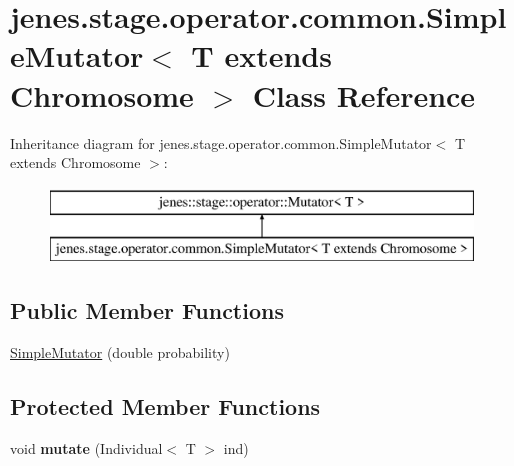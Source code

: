 \hypertarget{classjenes_1_1stage_1_1operator_1_1common_1_1_simple_mutator_3_01_t_01extends_01_chromosome_01_4}{\section{jenes.\-stage.\-operator.\-common.\-Simple\-Mutator$<$ T extends Chromosome $>$ Class Reference}
\label{classjenes_1_1stage_1_1operator_1_1common_1_1_simple_mutator_3_01_t_01extends_01_chromosome_01_4}
}
Inheritance diagram for jenes.\-stage.\-operator.\-common.\-Simple\-Mutator$<$ T extends Chromosome $>$\-:\begin{figure}[H]
\begin{center}
\leavevmode
\includegraphics[height=2.000000cm]{classjenes_1_1stage_1_1operator_1_1common_1_1_simple_mutator_3_01_t_01extends_01_chromosome_01_4}
\end{center}
\end{figure}
\subsection*{Public Member Functions}
\begin{DoxyCompactItemize}
\item 
\hyperlink{classjenes_1_1stage_1_1operator_1_1common_1_1_simple_mutator_3_01_t_01extends_01_chromosome_01_4_a5872d2360575c78f7b010aaee5ba5b30}{Simple\-Mutator} (double probability)
\end{DoxyCompactItemize}
\subsection*{Protected Member Functions}
\begin{DoxyCompactItemize}
\item 
\hypertarget{classjenes_1_1stage_1_1operator_1_1common_1_1_simple_mutator_3_01_t_01extends_01_chromosome_01_4_af54219113222ec25ff39116d3925cc4d}{void {\bfseries mutate} (Individual$<$ T $>$ ind)}\label{classjenes_1_1stage_1_1operator_1_1common_1_1_simple_mutator_3_01_t_01extends_01_chromosome_01_4_af54219113222ec25ff39116d3925cc4d}

\end{DoxyCompactItemize}


